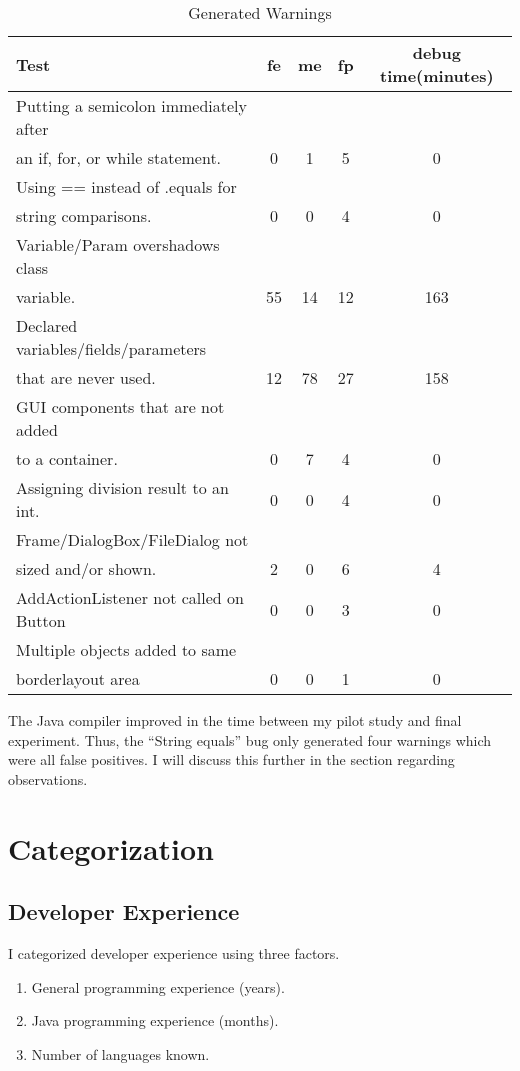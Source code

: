 \begin{table}[htpb]
  \caption{Generated Warnings}
  \begin{center}
  \begin{tabular}{|l|c|c|c|c|}
    \hline Test & fe & me & fp & debug time(minutes) \\ \hline \hline
    Putting a semicolon immediately after & & & & \\
    an if, for, or while statement.
    & 0 & 1 & 5 & 0 \\ \hline
    Using == instead of .equals for & & & & \\
    string comparisons. 
    & 0 & 0 & 4 & 0 \\ \hline
    Variable/Param overshadows class & & & & \\
    variable.
    & 55 & 14 & 12 & 163 \\ \hline
    Declared variables/fields/parameters & & & &\\
    that are never used.
    & 12 & 78 & 27 & 158 \\ \hline  %
    GUI components that are not added & & & & \\
    to a container.
    & 0 & 7 & 4 & 0 \\ \hline
    Assigning division result to an int.
    & 0 & 0 & 4 & 0 \\ \hline
    Frame/DialogBox/FileDialog not & & & & \\
    sized and/or shown.
    & 2 & 0 & 6 & 4 \\ \hline
    AddActionListener not called on Button
    & 0 & 0 & 3 & 0 \\ \hline
    Multiple objects added to same & & & & \\
    borderlayout area
    & 0 & 0 & 1 & 0 \\ \hline    
   \end{tabular}
  \end{center}
 \label{Generated Warnings}
\end{table}

The Java compiler improved in the time between my pilot study and final
experiment.  Thus, the ``String equals'' bug only generated four warnings
which were all false positives.  I will discuss this further in the section
regarding observations.

\section{Categorization}
\subsection{Developer Experience}
I categorized developer experience using three factors.
\begin{enumerate}
\item General programming experience (years).
\item Java programming experience (months).
\item Number of languages known.
\end{enumerate}

